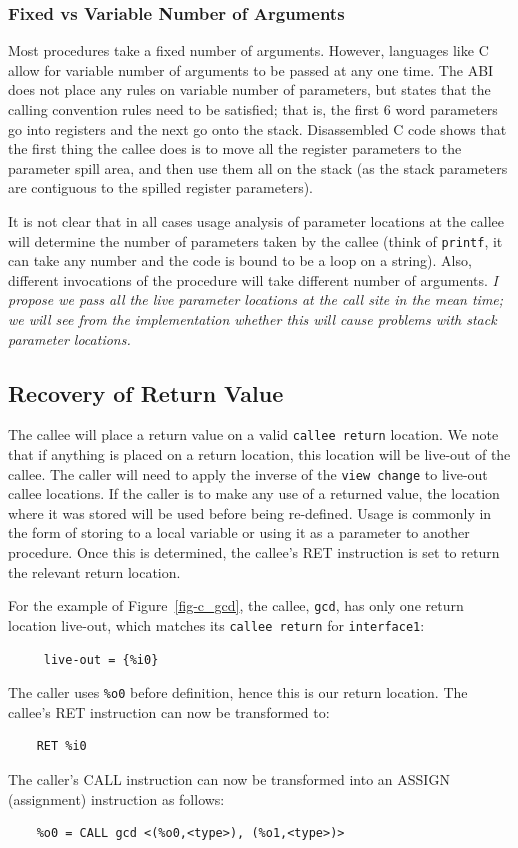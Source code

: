 \subsubsection*{Fixed vs Variable Number of Arguments}
Most procedures take a fixed number of arguments.  However, languages
like C allow for variable number of arguments to be passed at any
one time.  The ABI~\cite{Unix90} does not place any rules on variable 
number of parameters, but states that the calling convention rules need to 
be satisfied; that is, the first 6 word parameters go into registers
and the next go onto the stack.  Disassembled C code shows that 
the first thing the callee does is to move all the register parameters
to the parameter spill area, and then use them all on the stack 
(as the stack parameters are contiguous to the spilled register 
parameters). 

It is not clear that in all cases usage analysis of parameter 
locations at the callee will determine the number of parameters
taken by the callee (think of \texttt{printf}, it can take any
number and the code is bound to be a loop on a string).  
Also, different invocations of the procedure will take different
number of arguments.
\emph{I propose we pass all the live parameter locations at the call
site in the mean time; we will see from the implementation whether
this will cause problems with stack parameter locations.}


\subsection{Recovery of Return Value}
The callee will place a return value on a valid \texttt{callee return}
location.  We note that if anything is placed on a return location,
this location will be live-out of the callee.  
The caller will need to apply the inverse of the \texttt{view change}
to live-out callee locations.  
If the caller is to make any use of a returned value, the location
where it was stored will be used before being re-defined.  Usage is 
commonly in the form of storing to a local variable or using it
as a parameter to another procedure.  
Once this is determined, the callee's RET instruction is set to 
return the relevant return location.
 
For the example of Figure~\ref{fig-c_gcd}, the callee, \texttt{gcd}, 
has only one return location live-out, which matches its \texttt{callee
return} for \texttt{interface1}: 
\begin{verbatim}
     live-out = {%i0}
\end{verbatim}
The caller uses \texttt{\%o0} before definition, hence this is our
return location. 
The callee's RET instruction can now be transformed to: 
\begin{verbatim}
    RET %i0
\end{verbatim}
The caller's CALL instruction can now be transformed into an ASSIGN 
(assignment) instruction as follows: 
\begin{verbatim}
    %o0 = CALL gcd <(%o0,<type>), (%o1,<type>)>
\end{verbatim}

